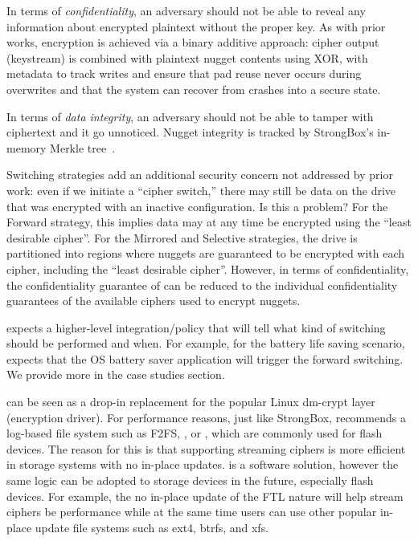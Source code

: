  In terms of {\em confidentiality}, an
adversary should not be able to reveal any information about encrypted plaintext
without the proper key. As with prior works, encryption is achieved via a binary
additive approach: cipher output (keystream) is combined with plaintext nugget
contents using XOR, with metadata to track writes and ensure that pad reuse
never occurs during overwrites and that the system can recover from crashes into
a secure state.

In terms of {\em data integrity}, an adversary should not be able to tamper with
ciphertext and it go unnoticed. Nugget integrity is tracked by StrongBox's
in-memory Merkle tree~\cite{StrongBox}.

Switching strategies add an additional security concern not addressed by prior
work: even if we initiate a ``cipher switch,'' there may still be data on the
drive that was encrypted with an inactive configuration. Is this a problem? For
the Forward strategy, this implies data may at any time be encrypted using the
``least desirable cipher''. For the Mirrored and Selective strategies, the drive
is partitioned into regions where nuggets are guaranteed to be encrypted with
each cipher, including the ``least desirable cipher''. However, in terms of
confidentiality, the confidentiality guarantee of \sys can be reduced to the
individual confidentiality guarantees of the available ciphers used to encrypt
nuggets. 

 \sys expects a higher-level integration/policy
that will tell \sys what kind of switching should be performed and when. For
example, for the battery life saving scenario, \sys expects that the OS battery
saver application will trigger the forward switching. We provide more in the
case studies section.

 \sys can be seen as a drop-in replacement for the popular
Linux dm-crypt layer (encryption driver). For performance reasons, just like
StrongBox, \sys recommends a log-based file system such as F2FS, \xxx, or \xxx,
which are commonly used for flash devices. The reason for this is that
supporting streaming ciphers is more efficient in storage systems with no
in-place updates. \sys is a software solution, however the same logic can be
adopted to storage devices in the future, especially flash devices. For example,
the no in-place update of the FTL nature will help stream ciphers be performance
while at the same time users can use other popular in-place update file systems
such as ext4, btrfs, and xfs.
